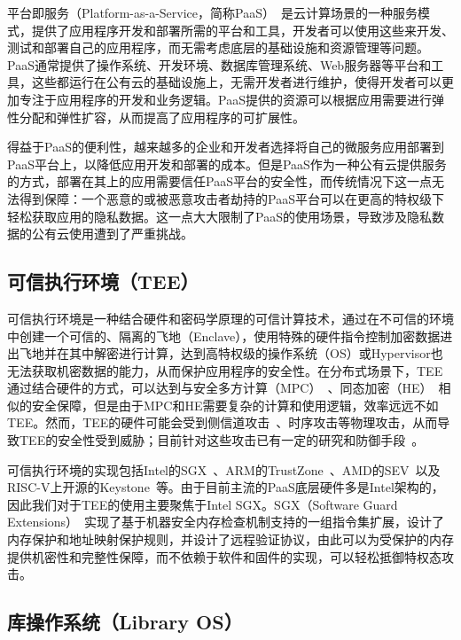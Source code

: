 平台即服务（Platform-as-a-Service，简称PaaS）~\cite{mell2011nist}是云计算场景的一种服务模式，提供了应用程序开发和部署所需的平台和工具，开发者可以使用这些来开发、测试和部署自己的应用程序，而无需考虑底层的基础设施和资源管理等问题。PaaS通常提供了操作系统、开发环境、数据库管理系统、Web服务器等平台和工具，这些都运行在公有云的基础设施上，无需开发者进行维护，使得开发者可以更加专注于应用程序的开发和业务逻辑。PaaS提供的资源可以根据应用需要进行弹性分配和弹性扩容，从而提高了应用程序的可扩展性。

得益于PaaS的便利性，越来越多的企业和开发者选择将自己的微服务应用部署到PaaS平台上，以降低应用开发和部署的成本。但是PaaS作为一种公有云提供服务的方式，部署在其上的应用需要信任PaaS平台的安全性，而传统情况下这一点无法得到保障：一个恶意的或被恶意攻击者劫持的PaaS平台可以在更高的特权级下轻松获取应用的隐私数据。这一点大大限制了PaaS的使用场景，导致涉及隐私数据的公有云使用遭到了严重挑战。

\subsection{可信执行环境（TEE）}

可信执行环境是一种结合硬件和密码学原理的可信计算技术，通过在不可信的环境中创建一个可信的、隔离的飞地（Enclave），使用特殊的硬件指令控制加密数据进出飞地并在其中解密进行计算，达到高特权级的操作系统（OS）或Hypervisor也无法获取机密数据的能力，从而保护应用程序的安全性。在分布式场景下，TEE通过结合硬件的方式，可以达到与安全多方计算（MPC）~\cite{afram2014theory}、同态加密（HE）~\cite{gentry2009fully}相似的安全保障，但是由于MPC和HE需要复杂的计算和使用逻辑，效率远远不如TEE。然而，TEE的硬件可能会受到侧信道攻击~\cite{oleksenko2018varys}、时序攻击等物理攻击，从而导致TEE的安全性受到威胁；目前针对这些攻击已有一定的研究和防御手段~\cite{oleksenko2018varys}。

可信执行环境的实现包括Intel的SGX~\cite{costan2016intel}、ARM的TrustZone~\cite{arm2009security}、AMD的SEV~\cite{kaplan2016amd}以及RISC-V上开源的Keystone~\cite{lee2020keystone}等。由于目前主流的PaaS底层硬件多是Intel架构的，因此我们对于TEE的使用主要聚焦于Intel SGX。SGX（Software Guard Extensions）~\cite{costan2016intel}实现了基于机器安全内存检查机制支持的一组指令集扩展，设计了内存保护和地址映射保护规则，并设计了远程验证协议，由此可以为受保护的内存提供机密性和完整性保障，而不依赖于软件和固件的实现，可以轻松抵御特权态攻击。

\subsection{库操作系统（Library OS）}

